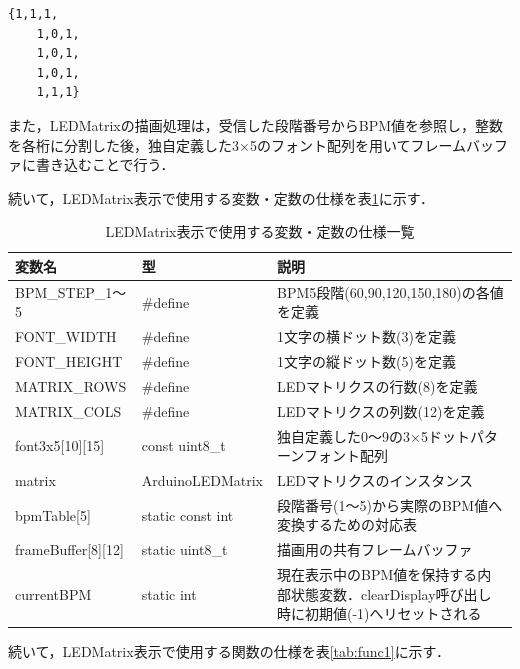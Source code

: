 \begin{lstlisting}[caption={font3x5配列における数字0のドットパターン定義}, label={lst:font0}]
    {1,1,1,
    1,0,1,
    1,0,1,
    1,0,1,
    1,1,1}
\end{lstlisting}

\noindent
また，LEDMatrixの描画処理は，受信した段階番号からBPM値を参照し，整数を各桁に分割した後，独自定義した3×5のフォント配列を用いてフレームバッファに書き込むことで行う．


続いて，LEDMatrix表示で使用する変数・定数の仕様を表\ref{table:kan_disp_var}に示す．

\begin{table}[H]
    \caption{LEDMatrix表示で使用する変数・定数の仕様一覧}
    \centering
    \label{table:kan_disp_var}
    \begin{tabular}{p{3.9cm}p{3.4cm}p{6.2cm}}
    \hline
    変数名 & 型 & 説明\\
    \hline\hline
    BPM\_STEP\_1〜5 & \#define & BPM5段階(60,90,120,150,180)の各値を定義\\
    \hline
    FONT\_WIDTH & \#define & 1文字の横ドット数(3)を定義\\
    \hline
    FONT\_HEIGHT & \#define & 1文字の縦ドット数(5)を定義\\
    \hline
    MATRIX\_ROWS & \#define & LEDマトリクスの行数(8)を定義\\
    \hline
    MATRIX\_COLS & \#define & LEDマトリクスの列数(12)を定義\\
    \hline
    font3x5[10][15] & const uint8\_t & 独自定義した0〜9の3×5ドットパターンフォント配列\\
    \hline
    matrix & ArduinoLEDMatrix & LEDマトリクスのインスタンス\\
    \hline
    bpmTable[5] & static const int & 段階番号(1〜5)から実際のBPM値へ変換するための対応表\\
    \hline
    frameBuffer[8][12] & static uint8\_t & 描画用の共有フレームバッファ\\
    \hline
    currentBPM & static int & 現在表示中のBPM値を保持する内部状態変数．clearDisplay呼び出し時に初期値(-1)へリセットされる\\
    \hline
    \end{tabular}
\end{table}

続いて，LEDMatrix表示で使用する関数の仕様を表\ref{tab:func1}に示す．

